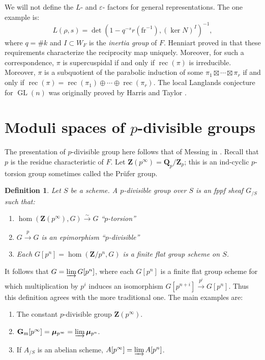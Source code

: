 \documentclass{article}
\DeclareMathOperator{\GL}{GL}
\DeclareMathOperator{\reciprocity}{rec}
\newcommand{\frob}{\mathrm{fr}} %
\newcommand{\Gm}{\mathbf{G}_\mathrm{m}}
\newcommand{\iso}{\xrightarrow\sim}
\newcommand{\dmu}{\bm\mu}
\newcommand{\dQ}{\mathbf{Q}}
\newcommand{\dZ}{\mathbf{Z}}
\newtheorem{definition}[subsection]{Definition}
\begin{document}
We will not define the $L$- and $\varepsilon$- factors for general 
representations. The one example is: 
\[
  L(\rho,s) = \det\left(1-q^{-s} r(\frob^{-1}), (\ker N)^I\right)^{-1} ,
\]
where $q=\# k$ and $I\subset W_F$ is the \emph{inertia group} of $F$.  
Henniart proved in \cite{henniart-1993} that these requirements characterize 
the reciprocity map uniquely. Moreover, for such a correspondence, $\pi$ is 
supercuspidal if and only if $\reciprocity(\pi)$ is irreducible. Moreover, 
$\pi$ is a subquotient of the parabolic induction of some 
$\pi_1\boxtimes\cdots\boxtimes \pi_r$ if and only if 
$\reciprocity(\pi) = \reciprocity(\pi_1)\oplus \cdots \oplus \reciprocity(\pi_r)$. 
The local Langlands conjecture for $\GL(n)$ was originally proved by 
Harris and Taylor \cite{harris-taylor-2001}. 





\section{Moduli spaces of \texorpdfstring{$p$}{p}-divisible groups}

The presentation of $p$-divisible group here follows that of 
Messing in \cite{messing-1972}. Recall that $p$ is the residue characteristic 
of $F$. Let $\dZ(p^\infty)=\dQ_p/\dZ_p$; this is an ind-cyclic $p$-torsion 
group sometimes called the Pr\"ufer group. 

\begin{definition}
Let $S$ be a scheme. A \emph{$p$-divisible group} over $S$ is an fppf 
sheaf $G_{/S}$ such that: 
\begin{enumerate}
  \item $\hom(\dZ(p^\infty),G)\iso G$ ``$p$-torsion''
  \item $G\xrightarrow p G$ is an epimorphism ``$p$-divisible''
  \item Each $G[p^n]=\hom(\dZ/p^n,G)$ is a finite flat group scheme on $S$. 
\end{enumerate}
\end{definition}

It follows that $G=\varinjlim G[p^n]$, where each $G[p^n]$ is a finite flat 
group scheme for which multiplication by $p^i$ induces an isomorphism 
$G[p^{n+i}]\xrightarrow{p^i}G[p^n]$. Thus this definition agrees with the more 
traditional one. The main examples are: 
\begin{enumerate}
  \item The constant $p$-divisible group $\dZ(p^\infty)$. 
  \item $\Gm[p^\infty] = \dmu_{p^\infty} = \varinjlim \dmu_{p^n}$. 
  \item If $A_{/S}$ is an abelian scheme, $A[p^\infty] = \varinjlim A[p^n]$. 
\end{enumerate}
\end{document}
